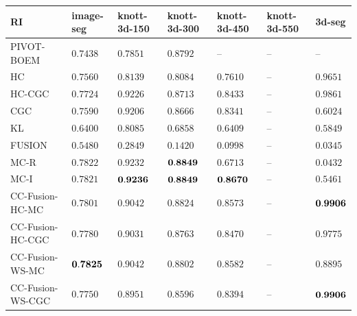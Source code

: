 \documentclass[10pt,twocolumn,letterpaper]{article}
\theoremstyle{definition}
\newcommand{\rd}{\color{red}}
\begin{document}
\begin{table}[t]
   \begin{tabular}{lllllll}
      \toprule
          RI              &  image-seg   & knott-3d-150 & knott-3d-300   & knott-3d-450 & knott-3d-550 &3d-seg\\
      \midrule 
         PIVOT-BOEM       &   $ 0.7438$  &\rd $ 0.7851$ &    $  0.8792$  &      --      &    --        &  --\\ 
         HC               &   $ 0.7560$  &\rd $ 0.8139$ &\rd $  0.8084$  &\rd $ 0.7610$ &    --        &   $ 0.9651$\\
         HC-CGC           &   $ 0.7724$  &    $ 0.9226$ &    $  0.8713$  &    $ 0.8433$ &    --        &   $ 0.9861$ \\
         CGC              &   $ 0.7590$  &    $ 0.9206$ &    $  0.8666$  &    $ 0.8341$ &    --        &\rd$ 0.6024$ \\
         KL               &\rd$ 0.6400$  &\rd $ 0.8085$ &\rd $  0.6858$  &\rd $ 0.6409$ &    --        &\rd$ 0.5849$\\
         FUSION           &\rd$ 0.5480$  &\rd $ 0.2849$ &\rd $  0.1420$  &\rd $ 0.0998$ &    --        &\rd$ 0.0345$ \\
         MC-R             &   $ 0.7822$  &    $ 0.9232$ & $\bf  0.8849$  &\rd $ 0.6713$ &    --        &\rd$ 0.0432$ \\   
         MC-I             &   $ 0.7821$  & $\bf 0.9236$ & $\bf  0.8849$  & $\bf 0.8670$ &    --        &\rd$ 0.5461$\\  
         CC-Fusion-HC-MC   &   $ 0.7801$  &    $ 0.9042$ &    $  0.8824$  &    $ 0.8573$ &    --        &$\bf 0.9906$ \\  
         CC-Fusion-HC-CGC  &   $ 0.7780$  &    $ 0.9031$ &    $  0.8763$  &    $ 0.8470$ &    --        &   $ 0.9775$ \\  
         CC-Fusion-WS-MC   &$\bf 0.7825$  &    $ 0.9042$ &    $  0.8802$  &    $ 0.8582$ &    --        &   $ 0.8895$ \\  
         CC-Fusion-WS-CGC  &   $ 0.7750$  &    $ 0.8951$ &    $  0.8596$  &    $ 0.8394$ &    --        &   $\bf 0.9906$ \\      
      \bottomrule
   \end{tabular}
\end{table}

%
\end{document}
